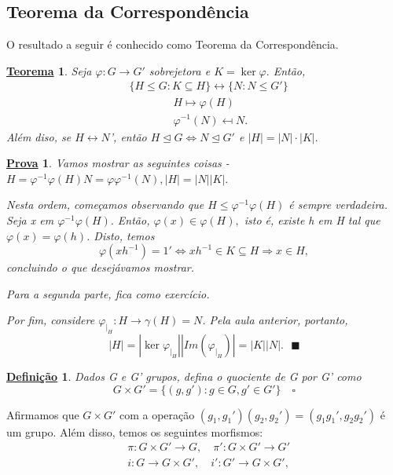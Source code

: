 \documentclass{article}
\newtheorem*{def*}{\underline{Defini\c c\~ao}}
\newtheorem*{theorem*}{\underline{Teorema}}
\newtheorem*{proof*}{\underline{Prova}}
\renewcommand\qedsymbol{$\blacksquare$}
\begin{document}
\subsection{Teorema da Correspond\^encia}
  O resultado a seguir \'e conhecido como Teorema da Correspond\^encia.
\begin{theorem*}
  Seja $\varphi:G\rightarrow G'$ sobrejetora e $K=\ker{\varphi}.$ Ent\~ao,  
  \begin{align*}
    &\{H\leq{G}: K \subseteq{H}\} \longleftrightarrow \{N: N\leq{G'}\}\\
    &\quad\quad\quad\quad H\mapsto \varphi(H)\\
    &\quad\quad\quad\quad \varphi^{-1}(N)\mapsfrom N.
  \end{align*}
  Al\'em diso, se $H\leftrightarrow N$', ent\~ao $H\trianglelefteq{G} \Longleftrightarrow N\trianglelefteq{G'}$ e
  $|H| = |N|\cdot|K|.$
\end{theorem*}
\begin{proof*}
  Vamos mostrar as seguintes coisas - $H = \varphi^{-1}\varphi(H) N = \varphi \varphi^{-1}(N), |H|=|N||K|.$ 

  Nesta ordem, come\c camos observando que $H\leq{\varphi^{-1}\varphi(H)}$ \'e sempre verdadeira. Seja x em $\varphi^{-1}\varphi(H).$
  Ent\~ao, $\varphi(x)\in\varphi(H),$ isto \'e, existe h em H tal que $\varphi(x) = \varphi(h)$. Disto, temos 
    $$
      \varphi(xh^{-1}) = 1' \Longleftrightarrow xh^{-1}\in K\subseteq{H} \Rightarrow x\in H,
    $$
  concluindo o que desej\'avamos mostrar.

  Para a segunda parte, fica como exerc\'icio.

  Por fim, considere $\varphi_{|_{H}}:H\rightarrow \gamma(H) = N$. Pela aula anterior, portanto,
    $$
    |H| = |\ker{\varphi_{|_{H}}}||Im(\varphi_{|_{H}})| = |K||N|.\text{ \qedsymbol}
    $$
\end{proof*}
\begin{def*}
  Dados G e G' grupos, defina o quociente de G por G' como 
    $$
    G\times{G'} = \{(g, g'): g\in G, g'\in G'\}\quad\square
    $$
\end{def*}
  Afirmamos que $G\times{G'}$ com a opera\c c\~ao $(g_{1}, g_{1}')(g_{2}, g_{2}') = (g_{1}g_{1}', g_{2}g_{2}')$ \'e um grupo.
Al\'em disso, temos os seguintes morfismos:
 \begin{align*}
   & \pi:G\times{G'}\rightarrow G,\quad \pi':G\times{G'}\rightarrow G'\\
   &  i:G\rightarrow G\times{G'},\quad i':G'\rightarrow G\times{G'},
 \end{align*}
\end{document}
